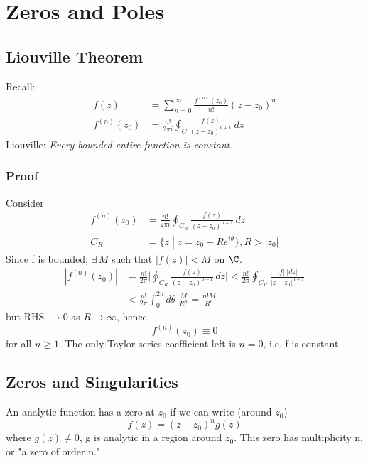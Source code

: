 \documentclass[a4paper, 11pt, normalem]{report}
\begin{document}
\chapter{Zeros and Poles}
\section{Liouville Theorem}
Recall:
\begin{align}
    f(z) &= \sum_{n=0}^\infty \frac{f^{(n)}(z_0)}{n!}(z - z_0)^n \tag{Taylor Series} \\
    f^{(n)}(z_0) &= \frac{n!}{2\pi i} \oint_C \frac{f(z)}{(z-z_0)^{n+1}}\,dz \tag{Cauchy Int Form}
\end{align}
Liouville: \emph{Every bounded entire function is constant.}

\subsection{Proof}
Consider
\begin{align}
    f^{(n)}(z_0) &= \frac{n!}{2\pi i}\oint_{C_R} \frac{f(z)}{(z-z_0)^{n+1}}\,dz \\
    C_R &= \{z\; |\; z = z_0 + Re^{i\theta}\}, R > |z_0|
\end{align}
Since f is bounded, $\exists\,M$ such that $|f(z)| < M$ on $\C$.
\begin{align}
    |f^{(n)}(z_0)| &= \frac{n!}{2\pi}\bigg|\oint_{C_R} \frac{f(z)}{(z-z_0)^{n+1}}\,dz\bigg| < \frac{n!}{2\pi}\oint_{C_R} \frac{|f|\;|dz|}{|z-z_0|^{n+1}} \\
                   &< \frac{n!}{2\pi} \int_{0}^{2\pi} d\theta\; \frac{M}{R^n} = \frac{n! M}{R^n}
\end{align}
but RHS $\to 0$ as $R \to \infty$, hence
\begin{equation}
    f^{(n)}(z_0) \equiv 0
\end{equation}
for all $n \geq 1$.
The only Taylor series coefficient left is $n=0$, i.e. f is constant.

\section{Zeros and Singularities}
An analytic function has a zero at $z_0$ if we can write (around $z_0$)
\begin{equation}
    f(z) = (z-z_0)^n g(z)
\end{equation}
where $g(z) \neq 0$, g is analytic in a region around $z_0$.
This zero has multiplicity n, or "a zero of order n."
\end{document}
